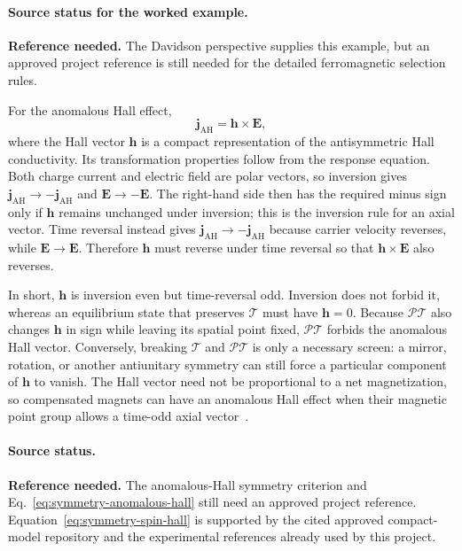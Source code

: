 \paragraph{Source status for the worked example.}
\textbf{Reference needed.}  The Davidson perspective supplies this example,
but an approved project reference is still needed for the detailed
ferromagnetic selection rules.

For the anomalous Hall effect,
\begin{equation}
    \mathbf{j}_{\mathrm{AH}}=\mathbf{h}\times\mathbf{E},
    \label{eq:symmetry-anomalous-hall}
\end{equation}
where the Hall vector $\mathbf{h}$ is a compact representation of the
antisymmetric Hall conductivity.  Its transformation properties follow from
the response equation.  Both charge current and electric field are polar
vectors, so inversion gives
$\mathbf{j}_{\mathrm{AH}}\to-\mathbf{j}_{\mathrm{AH}}$ and
$\mathbf{E}\to-\mathbf{E}$.  The right-hand side then has the required minus
sign only if $\mathbf{h}$ remains unchanged under inversion; this is the
inversion rule for an axial vector.  Time reversal instead gives
$\mathbf{j}_{\mathrm{AH}}\to-\mathbf{j}_{\mathrm{AH}}$ because carrier velocity
reverses, while $\mathbf{E}\to\mathbf{E}$.  Therefore $\mathbf{h}$ must reverse
under time reversal so that $\mathbf{h}\times\mathbf{E}$ also reverses.

In short, $\mathbf{h}$ is inversion even but time-reversal odd.  Inversion does
not forbid it, whereas an equilibrium state that preserves $\mathcal{T}$ must
have $\mathbf{h}=0$.  Because $\mathcal{PT}$ also changes $\mathbf{h}$ in sign
while leaving its spatial point fixed, $\mathcal{PT}$ forbids the anomalous
Hall vector.  Conversely, breaking $\mathcal{T}$ and $\mathcal{PT}$ is only a
necessary screen: a mirror, rotation, or another antiunitary symmetry can still
force a particular component of $\mathbf{h}$ to vanish.  The Hall vector need
not be proportional to a net magnetization, so compensated magnets can have an
anomalous Hall effect when their magnetic point group allows a time-odd axial
vector~\cite{smejkal2022ahe}.

\paragraph{Source status.}
\textbf{Reference needed.}  The anomalous-Hall symmetry criterion and
Eq.~\eqref{eq:symmetry-anomalous-hall} still need an approved project
reference.  Equation~\eqref{eq:symmetry-spin-hall} is supported by the cited
approved compact-model repository and the experimental references already
used by this project.

